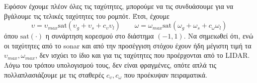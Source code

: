 Εφόσον έχουμε πλέον όλες τις ταχύτητες, μπορούμε να τις συνδυάσουμε για να βγάλουμε τις τελικές 
ταχύτητες του ρομπότ. Έτσι, έχουμε
$$
\upsilon = \upsilon_{max}\mathrm{sat}\left(\upsilon_{g}+\upsilon_{s}+c_\upsilon\upsilon_{l}\right) \qquad
\omega = \omega_{max} \mathrm{sat} \left( \omega_{g} + \omega_{s} + c_\omega\omega_{l} \right)
$$
όπου $\mathrm{sat}(\cdot)$ η συνάρτηση κορεσμού στο διάστημα $(-1, 1)$. Να σημειωθεί ότι, ενώ οι 
ταχύτητες από το sonar και από την προσέγγιση στόχου έχουν ήδη μέγιστη τιμή τα $\upsilon_{max},  
\omega_{max}$, δεν ισχύει το ίδιο και για τις ταχύτητες που προέρχονται από το LIDAR. Λόγω του 
τρόπου υπολογισμού τους, δεν είναι φραγμένες, οπότε απλά τις πολλαπλασιάζουμε με τις σταθερές $c_
\upsilon, c_\omega$ που προέκυψαν πειραματικά.